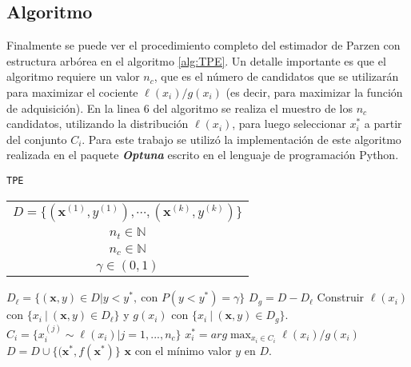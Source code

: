 \subsection*{Algoritmo}

Finalmente se puede ver el procedimiento completo del estimador de Parzen con estructura arbórea en el algoritmo \ref{alg:TPE}. Un detalle importante es que el algoritmo requiere un valor $n_c$, que es el número de candidatos que se utilizarán para maximizar el cociente $\ell(x_i)/g(x_i)$ (es decir, para maximizar la función de adquisición). En la linea 6 del algoritmo se realiza el muestro de los $n_c$ candidatos, utilizando la distribución $\ell(x_i)$, para luego seleccionar $x_i^*$ a partir del conjunto $C_i$.
Para este trabajo se utilizó la implementación de este algoritmo realizada en el paquete \textbf{\textit{Optuna}} \cite{optuna_2019} escrito en el lenguaje de programación Python.

\begin{algorithm}
\caption{\texttt{TPE}}
\label{alg:TPE}
\begin{algorithmic}[1]
\Require
\begin{tabular}{c}
$D = \{(\textbf{x}^{(1)},y^{(1)}), \cdots, (\textbf{x}^{(k)},y^{(k)}) \}$ \Comment{Observaciones}  \\ 
$n_t \in \mathbb{N}$ \Comment{número de iteraciones} \\ 
$n_c \in \mathbb{N}$ \Comment{número de candidatos} \\
$\gamma \in (0,1) $ \Comment{cuantil para obtener $y^*$}
\end{tabular} 

\vspace{1mm}
	\State $D_{\ell} = \{ (\textbf{x}, y) \in D | y < y^*, \ \text{con } P(y<y^*) = \gamma  \}$
	\State $D_g = D - D_{\ell}$
	 
		\State Construir $\ell(x_i)$ con $\{x_i \ | \ (\textbf{x}, y) \in D_{\ell}\}$ y $g(x_i)$ con $\{x_i \ | \ (\textbf{x}, y) \in D_g \}$.
		\State $C_i = \{ x_i^{(j)} \sim \ell(x_i)| j=1, ..., n_c \}$ 
		\State $x_{i}^* = arg \max_{x_i\in C_i} \ell(x_i)/g(x_i)$
	\EndFor
	\State $D = D \cup \{(\textbf{x}^*, f(\textbf{x}^*)\}$ 
\EndFor
\Ensure $\textbf{x}$ con el mínimo valor $y$ en $D$.
\vspace{3mm}

\end{algorithmic}
\end{algorithm}
 
